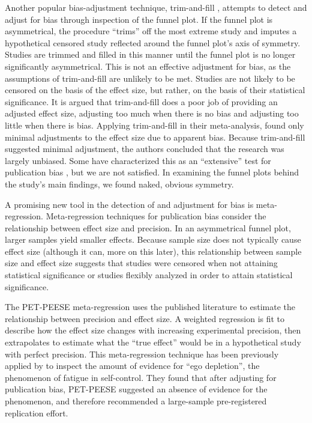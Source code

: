 \documentclass[man]{apa6}
\begin{document}
Another popular bias-adjustment technique, trim-and-fill \citep{Duval:Tweedie:2000}, attempts to detect and adjust for bias through inspection of the funnel plot. If the funnel plot is asymmetrical, the procedure ``trims'' off the most extreme study and imputes a hypothetical censored study reflected around the funnel plot's axis of symmetry. Studies are trimmed and filled in this manner until the funnel plot is no longer significantly asymmetrical. This is not an effective adjustment for bias, as the assumptions of trim-and-fill are unlikely to be met. Studies are not likely to be censored on the basis of the effect size, but rather, on the basis of their statistical significance. It is argued that trim-and-fill does a poor job of providing an adjusted effect size, adjusting too much when there is no bias and adjusting too little when there is bias. %
Applying trim-and-fill in their meta-analysis, \citet{Anderson:etal:2014} found only minimal adjustments to the effect size due to apparent bias. Because trim-and-fill suggested minimal adjustment, the authors concluded that the research was largely unbiased. %
Some have characterized this as an ``extensive'' test for publication bias \citep{some-chucklehead}, but we are not satisfied. In examining the funnel plots behind the study's main findings, we found naked, obvious symmetry. %

A promising new tool in the detection of and adjustment for bias is meta-regression. Meta-regression techniques for publication bias consider the relationship between effect size and precision. In an asymmetrical funnel plot, larger samples yield smaller effects. Because sample size does not typically cause effect size (although it can, more on this later), this relationship between sample size and effect size suggests that studies were censored when not attaining statistical significance or studies flexibly analyzed in order to attain statistical significance. 

The PET-PEESE meta-regression \citep{Stanley:Doucouliagos:2013} %
uses the published literature to estimate the relationship between precision and effect size. A weighted regression is fit to describe how the effect size changes with increasing experimental precision, then extrapolates to estimate what the ``true effect'' would be in a hypothetical study with perfect precision. This meta-regression technique has been previously applied by \citet{Carter:McCullough:2014} to inspect the amount of evidence for ``ego depletion'', the phenomenon of fatigue in self-control. They found that after adjusting for publication bias, PET-PEESE suggested an absence of evidence for the phenomenon, and therefore recommended a large-sample pre-registered replication effort.
\end{document}
